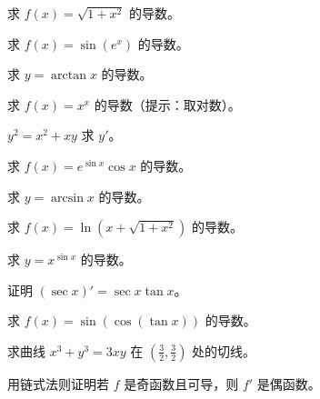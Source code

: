 \begin{exercise}[4] 求 \(f(x)=\sqrt{1+x^2}\) 的导数。\end{exercise}
\begin{exercise}[4] 求 \(f(x)=\sin(e^x)\) 的导数。\end{exercise}
\begin{exercise}[4] 求 \(y=\arctan x\) 的导数。\end{exercise}
\begin{exercise}[4] 求 \(f(x)=x^x\) 的导数（提示：取对数）。\end{exercise}
\begin{exercise}[4] \(y^2 = x^2 + xy\) 求 \(y'\)。\end{exercise}
\begin{exercise}[5] 求 \(f(x)=e^{\sin x}\cos x\) 的导数。\end{exercise}
\begin{exercise}[5] 求 \(y=\arcsin x\) 的导数。\end{exercise}
\begin{exercise}[5] 求 \(f(x)=\ln(x+\sqrt{1+x^2})\) 的导数。\end{exercise}
\begin{exercise}[5] 求 \(y=x^{\sin x}\) 的导数。\end{exercise}
\begin{exercise}[6] 证明 \((\sec x)'=\sec x\tan x\)。\end{exercise}
\begin{exercise}[6] 求 \(f(x)=\sin(\cos(\tan x))\) 的导数。\end{exercise}
\begin{exercise}[6] 求曲线 \(x^3+y^3=3xy\) 在 \((\frac32,\frac32)\) 处的切线。\end{exercise}
\begin{exercise}[7] 用链式法则证明若 \(f\) 是奇函数且可导，则 \(f'\) 是偶函数。\end{exercise}
